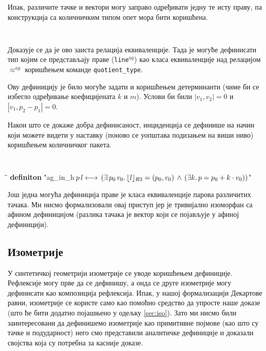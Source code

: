 Ипак, различите тачке и вектори могу заправо одређивати једну те исту
праву, па конструкција са количничким типом опет мора бити коришћена.
{\tt
\begin{tabbing}
\hspace{5mm}\=\\
\textbf{definition} "$l_1 \approx^{ag} l_2 \longleftrightarrow (\exists\,p_1\,v_1\,p_2\,v_2.$}\\
\>$\RepRt{l_1} = (p_1, v_1) \,\wedge\,  \RepRt{l_2} = (p_2, v_2) \,\wedge$\\
\>$(\exists k m.\ v_1 = k\cdot v_2 \,\wedge\, p_2 = p_1 + m\cdot v_1))$"}
\end{tabbing}
}
\noindent Доказује се да је ово заиста релација еквиваленције. Тада је
могуће дефинисати тип којим се представљају праве ({\tt line$^{ag}$})
као класа еквиваленције над релацијом $\approx^{ag}$ коришћењем
команде {\tt quotient\_type}.

Ову дефиницију је било могуће задати и коришћењем детерминанти (чиме
би се избегло одређивање коефицијената $k$ и $m$). Услови би били
$|v_1, v_2| = 0$ и $|v_1, p_2 - p_1| = 0$.

Након што се докаже добра дефинисаност, инциденција се дефинише на
начин који можете видети у наставку (поново се уопштава подизањем на
виши ниво) коришћењем количничког пакета.  
{\tt
\begin{tabbing}
\hspace{5mm}\=\hspace{5mm}\=\kill
\textbf{definiton} "ag\_in\_h$\,p\,l\longleftrightarrow\,(\exists\,p_0\,v_0.\, \lfloor l\rfloor_{R3} = (p_0, v_0) \,\wedge\,  (\exists k.\,p = p_0 + k \cdot v_0))$"
\end{tabbing}
}
Још једна могућа дефиниција праве је класа еквиваленције парова
различитих тачака. Ми нисмо формализовали овај приступ јер је
тривијално изоморфан са афином дефиницијом (разлика тачака је вектор
који се појављује у афиној дефиницији).

\subsection{Изометрије}

У синтетичкој геометрији изометрије се уводе коришћењем
дефиниције. Рефлексије могу прве да се дефинишу, а онда се друге
изометрије могу дефинисати као композиција рефлексија. Ипак, у нашој
формализацији Декартове равни, изометрије се користе само као помоћно
средство да упросте наше доказе (што ће бити додатно појашњено у
одељку \ref{sec:iso}). Зато ми нисмо били заинтересовани да дефинишемо
изометрије као примитивне појмове (као што су тачке и
подударност) него смо представили аналитичке дефиниције и
доказали својства која су потребна за касније доказе.

